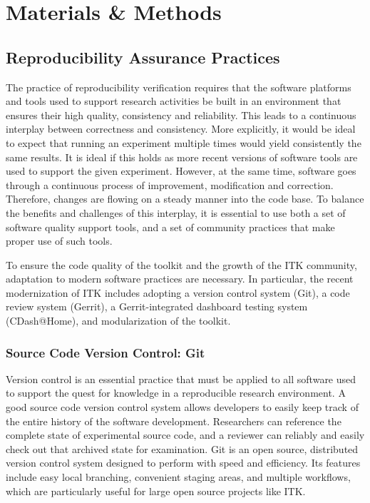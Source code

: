 \documentclass{frontiersENG} %
\begin{document}
\section{Materials \& Methods}



\subsection{Reproducibility Assurance Practices}

The practice of reproducibility verification requires that the software
platforms and tools used to support research activities be built in an
environment that ensures their high quality, consistency and reliability. This
leads to a continuous interplay between correctness and consistency. More
explicitly, it would be ideal to expect that running an experiment multiple times
would yield consistently the same results. It is ideal if this holds as more
recent versions of software tools are used to support the given experiment.
However, at the same time, software goes through a continuous process of
improvement, modification and correction. Therefore, changes are flowing on a
steady manner into the code base. To balance the benefits and challenges of
this interplay, it is essential to use both a set of software quality support
tools, and a set of community practices that make proper use of such tools.

To ensure the code quality of the toolkit and the growth of the ITK community,
adaptation to modern software practices are necessary. In particular, the
recent modernization of ITK includes adopting a version control system (Git),
 a code review system (Gerrit), a Gerrit-integrated dashboard testing system
(CDash@Home), and modularization of the toolkit.


\subsubsection{Source Code Version Control: Git}

Version control is an
essential practice that must be applied to all software used to support the
quest for knowledge in a reproducible research environment. A good source code
version control system allows developers to easily keep track of the entire
history of the software development. Researchers can reference the complete
state of experimental source code, and a reviewer can reliably and easily
check out that archived state for examination.  Git is an open source, distributed version
control system designed to perform with speed and efficiency. Its features
include easy local branching, convenient staging areas, and multiple workflows,
which are particularly useful for large open source projects like ITK.
\end{document}
